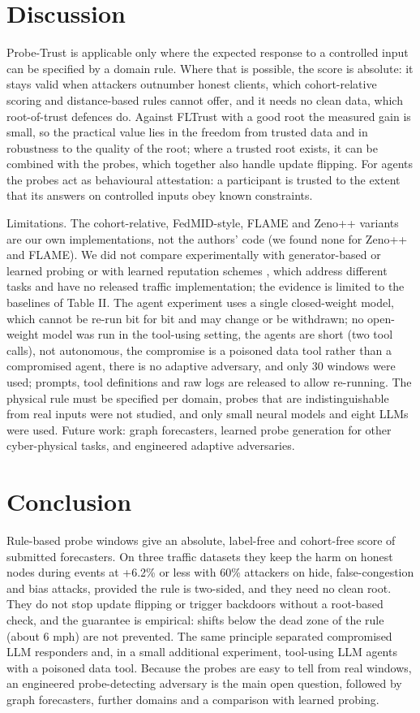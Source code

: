 \documentclass[journal]{IEEEtran}
\begin{document}
\section{Discussion}
Probe-Trust is applicable only where the expected response to a controlled input can be specified by a domain rule. Where that is possible, the score is absolute: it stays valid when attackers outnumber honest clients, which cohort-relative scoring \cite{uav} and distance-based rules cannot offer, and it needs no clean data, which root-of-trust defences \cite{fltrust,zeno} do. Against FLTrust with a good root the measured gain is small, so the practical value lies in the freedom from trusted data and in robustness to the quality of the root; where a trusted root exists, it can be combined with the probes, which together also handle update flipping. For agents the probes act as behavioural attestation: a participant is trusted to the extent that its answers on controlled inputs obey known constraints.

Limitations. The cohort-relative, FedMID-style, FLAME and Zeno++ variants are our own implementations, not the authors' code (we found none for Zeno++ and FLAME). We did not compare experimentally with generator-based or learned probing \cite{zafar,fedfg,specshield} or with learned reputation schemes \cite{rohfl,securegraphfl,flare,traftrust}, which address different tasks and have no released traffic implementation; the evidence is limited to the baselines of Table II. The agent experiment uses a single closed-weight model, which cannot be re-run bit for bit and may change or be withdrawn; no open-weight model was run in the tool-using setting, the agents are short (two tool calls), not autonomous, the compromise is a poisoned data tool rather than a compromised agent, there is no adaptive adversary, and only 30 windows were used; prompts, tool definitions and raw logs are released to allow re-running. The physical rule must be specified per domain, probes that are indistinguishable from real inputs were not studied, and only small neural models and eight LLMs were used. Future work: graph forecasters, learned probe generation for other cyber-physical tasks, and engineered adaptive adversaries.

\section{Conclusion}
Rule-based probe windows give an absolute, label-free and cohort-free score of submitted forecasters. On three traffic datasets they keep the harm on honest nodes during events at +6.2\% or less with 60\% attackers on hide, false-congestion and bias attacks, provided the rule is two-sided, and they need no clean root. They do not stop update flipping or trigger backdoors without a root-based check, and the guarantee is empirical: shifts below the dead zone of the rule (about 6 mph) are not prevented. The same principle separated compromised LLM responders and, in a small additional experiment, tool-using LLM agents with a poisoned data tool. Because the probes are easy to tell from real windows, an engineered probe-detecting adversary is the main open question, followed by graph forecasters, further domains and a comparison with learned probing.
\end{document}
